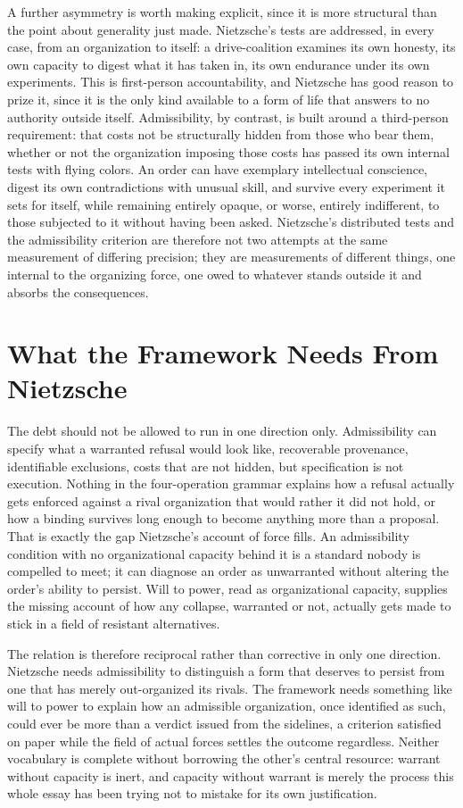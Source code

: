 \documentclass[11pt]{article}
\begin{document}
A further asymmetry is worth making explicit, since it is more structural than the point about generality just made. Nietzsche's tests are addressed, in every case, from an organization to itself: a drive-coalition examines its own honesty, its own capacity to digest what it has taken in, its own endurance under its own experiments. This is first-person accountability, and Nietzsche has good reason to prize it, since it is the only kind available to a form of life that answers to no authority outside itself. Admissibility, by contrast, is built around a third-person requirement: that costs not be structurally hidden from those who bear them, whether or not the organization imposing those costs has passed its own internal tests with flying colors. An order can have exemplary intellectual conscience, digest its own contradictions with unusual skill, and survive every experiment it sets for itself, while remaining entirely opaque, or worse, entirely indifferent, to those subjected to it without having been asked. Nietzsche's distributed tests and the admissibility criterion are therefore not two attempts at the same measurement of differing precision; they are measurements of different things, one internal to the organizing force, one owed to whatever stands outside it and absorbs the consequences.

\section*{What the Framework Needs From Nietzsche}

The debt should not be allowed to run in one direction only. Admissibility can specify what a warranted refusal would look like, recoverable provenance, identifiable exclusions, costs that are not hidden, but specification is not execution. Nothing in the four-operation grammar explains how a refusal actually gets enforced against a rival organization that would rather it did not hold, or how a binding survives long enough to become anything more than a proposal. That is exactly the gap Nietzsche's account of force fills. An admissibility condition with no organizational capacity behind it is a standard nobody is compelled to meet; it can diagnose an order as unwarranted without altering the order's ability to persist. Will to power, read as organizational capacity, supplies the missing account of how any collapse, warranted or not, actually gets made to stick in a field of resistant alternatives.

The relation is therefore reciprocal rather than corrective in only one direction. Nietzsche needs admissibility to distinguish a form that deserves to persist from one that has merely out-organized its rivals. The framework needs something like will to power to explain how an admissible organization, once identified as such, could ever be more than a verdict issued from the sidelines, a criterion satisfied on paper while the field of actual forces settles the outcome regardless. Neither vocabulary is complete without borrowing the other's central resource: warrant without capacity is inert, and capacity without warrant is merely the process this whole essay has been trying not to mistake for its own justification.
\end{document}
